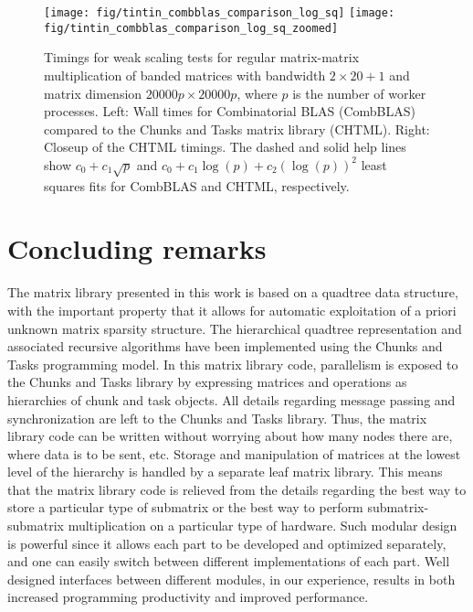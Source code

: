 \documentclass{elsarticle}
\begin{document}
\begin{figure}
  \begin{center}
    \texttt{[image: fig/tintin\_combblas\_comparison\_log\_sq]}
    \texttt{[image: fig/tintin\_combblas\_comparison\_log\_sq\_zoomed]}
  \end{center}
  \caption{Timings for weak scaling tests for regular matrix-matrix
    multiplication of banded matrices with bandwidth $2 \times 20+1$
    and matrix dimension $20000p \times 20000p$, where $p$ is the
    number of worker processes. Left: Wall times for Combinatorial
    BLAS (CombBLAS) compared to the Chunks and Tasks matrix library
    (CHTML). Right: Closeup of the CHTML timings.  The dashed and
    solid help lines show $c_0 + c_1 \sqrt{p}$ and $c_0 + c_1 \log(p)
    + c_2 (\log(p))^2$ least squares fits for CombBLAS and CHTML,
    respectively.
    \label{fig:tintin_combblas_comparison}}
\end{figure}

 
 


\section{Concluding remarks}\label{sec:conclusions}

The matrix library presented in this work is based on a quadtree data
structure, with the important property that it allows for automatic
exploitation of a priori unknown
matrix sparsity structure.  The
hierarchical quadtree representation and associated recursive
algorithms have been implemented using the Chunks and Tasks
programming model.
In this matrix library code, parallelism is exposed to the Chunks and
Tasks library by expressing matrices and operations as hierarchies of
chunk and task objects. All details regarding message passing and
synchronization are left to the Chunks and Tasks library. Thus, the
matrix library code can be written without worrying about how many
nodes there are, where data is to be sent, etc.
Storage and manipulation of matrices at the lowest level of the
hierarchy is handled by a separate leaf matrix library. This means
that the matrix library code is relieved from the details regarding
the best way to store a particular type of submatrix 
or the best way to perform submatrix-submatrix
multiplication on a particular type of hardware.
Such modular design is powerful since it allows each part to be
developed and optimized separately, and one can easily switch between
different implementations of each part. Well designed interfaces
between different modules, in our experience, results in both
increased programming productivity and improved performance.
\end{document}
